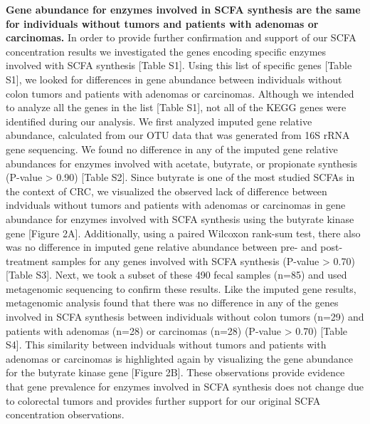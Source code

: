 \documentclass[11pt,]{article}
\begin{document}
\textbf{Gene abundance for enzymes involved in SCFA synthesis are the
same for individuals without tumors and patients with adenomas or
carcinomas.} In order to provide further confirmation and support of our
SCFA concentration results we investigated the genes encoding specific
enzymes involved with SCFA synthesis {[}Table S1{]}. Using this list of
specific genes {[}Table S1{]}, we looked for differences in gene
abundance between individuals without colon tumors and patients with
adenomas or carcinomas. Although we intended to analyze all the genes in
the list {[}Table S1{]}, not all of the KEGG genes were identified
during our analysis. We first analyzed imputed gene relative abundance,
calculated from our OTU data that was generated from 16S rRNA gene
sequencing. We found no difference in any of the imputed gene relative
abundances for enzymes involved with acetate, butyrate, or propionate
synthesis (P-value \textgreater{} 0.90) {[}Table S2{]}. Since butyrate
is one of the most studied SCFAs in the context of CRC, we visualized
the observed lack of difference between indviduals without tumors and
patients with adenomas or carcinomas in gene abundance for enzymes
involved with SCFA synthesis using the butyrate kinase gene {[}Figure
2A{]}. Additionally, using a paired Wilcoxon rank-sum test, there also
was no difference in imputed gene relative abundance between pre- and
post-treatment samples for any genes involved with SCFA synthesis
(P-value \textgreater{} 0.70) {[}Table S3{]}. Next, we took a subset of
these 490 fecal samples (n=85) and used metagenomic sequencing to
confirm these results. Like the imputed gene results, metagenomic
analysis found that there was no difference in any of the genes involved
in SCFA synthesis between individuals without colon tumors (n=29) and
patients with adenomas (n=28) or carcinomas (n=28) (P-value
\textgreater{} 0.70) {[}Table S4{]}. This similarity between indviduals
without tumors and patients with adenomas or carcinomas is highlighted
again by visualizing the gene abundance for the butyrate kinase gene
{[}Figure 2B{]}. These observations provide evidence that gene
prevalence for enzymes involved in SCFA synthesis does not change due to
colorectal tumors and provides further support for our original SCFA
concentration observations.
\end{document}
